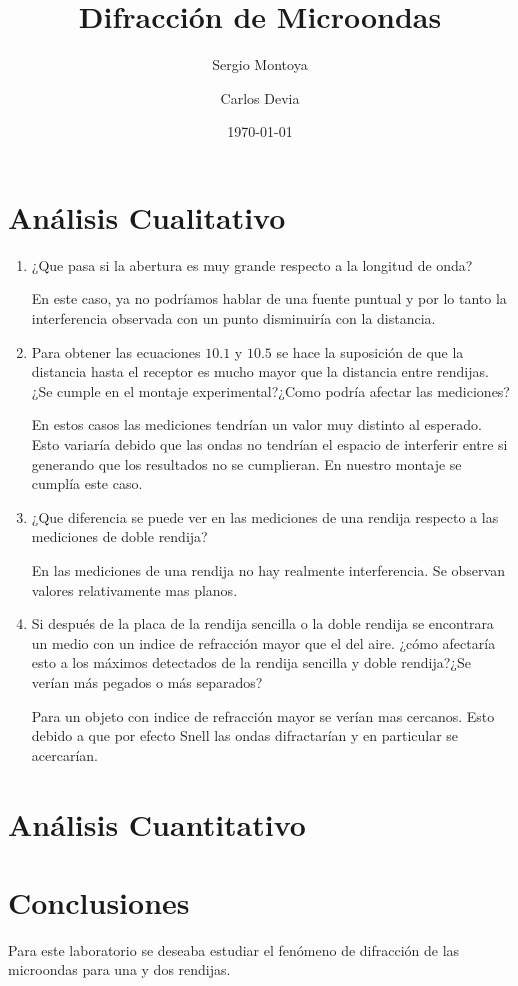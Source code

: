 \documentclass[a4paper, amsfonts, amssymb, amsmath, reprint, showkeys, nofootinbib, twoside]{revtex4-1}
\begin{document}
\title{Difracción de Microondas}


\author{Sergio Montoya}

  
\author{Carlos Devia}


\date{\today} %

\maketitle

\section{Análisis Cualitativo}

\begin{enumerate}
  \item ¿Que pasa si la abertura es muy grande respecto a la longitud de onda?

    En este caso, ya no podríamos hablar de una fuente puntual y por lo tanto la interferencia observada con un punto disminuiría con la distancia.

  \item Para obtener las ecuaciones $10.1$ y  $10.5$ se hace la suposición de que la distancia hasta el receptor es mucho mayor que la distancia entre rendijas. ¿Se cumple en el montaje experimental?¿Como podría afectar las mediciones?

    En estos casos las mediciones tendrían un valor muy distinto al esperado. Esto variaría debido que las ondas no tendrían el espacio de interferir entre si generando que los resultados no se cumplieran. En nuestro montaje se cumplía este caso.

  \item ¿Que diferencia se puede ver en las mediciones de una rendija respecto a las mediciones de doble rendija?


    En las mediciones de una rendija no hay realmente interferencia. Se observan valores relativamente mas planos.
  \item Si después de la placa de la rendija sencilla o la doble rendija se encontrara un medio con un indice de refracción mayor que el del aire. ¿cómo afectaría esto a los máximos detectados de la rendija sencilla y doble rendija?¿Se verían más pegados o más separados?

    Para un objeto con indice de refracción mayor se verían mas cercanos. Esto debido a que por efecto Snell las ondas difractarían y en particular se acercarían.
\end{enumerate}

\section{Análisis Cuantitativo}

\section{Conclusiones}

Para este laboratorio se deseaba estudiar el fenómeno de difracción de las microondas para una y dos rendijas.	
\end{document}
